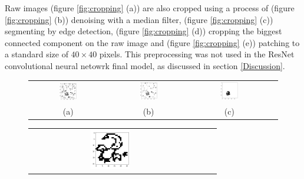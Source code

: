 \documentclass[reqno]{amsart}
\begin{document}
Raw images (figure \ref{fig:cropping} (a)) are also cropped using a process of (figure \ref{fig:cropping} (b)) denoising with a median filter, (figure \ref{fig:cropping} (c)) segmenting by edge detection, (figure \ref{fig:cropping} (d)) cropping the biggest connected component on the raw image and (figure \ref{fig:cropping} (e)) patching to a standard size of $40 \times 40$ pixels. This preprocessing was not used in the ResNet convolutional neural netowrk final model, as discussed in section \ref{Discussion}.\\

\begin{figure} [H]
\centering
\begin{tabular}{cccc}
\includegraphics[width=0.25\textwidth]{Figures/raw.png} &
\includegraphics[width=0.25\textwidth]{Figures/denoised.png} &
\includegraphics[width=0.25\textwidth]{Figures/biggest_connected_element.png} \\
(a)  & (b) & (c)  \\[6pt]
\end{tabular}
\begin{tabular}{cccc}
\includegraphics[width=0.25\textwidth]{Figures/crop.png} &

\end{tabular}
\end{figure}
\end{document}
